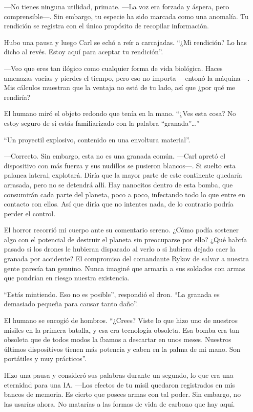 —No tienes ninguna utilidad, primate. —La voz era forzada y áspera, pero comprensible—. Sin embargo, tu especie ha sido marcada como una anomalía. Tu rendición se registra con el único propósito de recopilar información.

Hubo una pausa y luego Carl se echó a reír a carcajadas. “¿Mi rendición? Lo has dicho al revés. Estoy aquí para aceptar tu rendición”.

—Veo que eres tan ilógico como cualquier forma de vida biológica. Haces amenazas vacías y pierdes el tiempo, pero eso no importa —entonó la máquina—. Mis cálculos muestran que la ventaja no está de tu lado, así que ¿por qué me rendiría?

El humano miró el objeto redondo que tenía en la mano. “¿Ves esta cosa? No estoy seguro de si estás familiarizado con la palabra “granada”…”

“Un proyectil explosivo, contenido en una envoltura material”.

—Correcto. Sin embargo, esta no es una granada común. —Carl apretó el dispositivo con más fuerza y sus nudillos se pusieron blancos—. Si suelto esta palanca lateral, explotará. Diría que la mayor parte de este continente quedaría arrasada, pero no se detendrá allí. Hay nanocitos dentro de esta bomba, que consumirán cada parte del planeta, poco a poco, infectando todo lo que entre en contacto con ellos. Así que diría que no intentes nada, de lo contrario podría perder el control.

El horror recorrió mi cuerpo ante su comentario sereno. ¿Cómo podía sostener algo con el potencial de destruir el planeta sin preocuparse por ello? ¿Qué habría pasado si los drones le hubieran disparado al verlo o si hubiera dejado caer la granada por accidente? El compromiso del comandante Rykov de salvar a nuestra gente parecía tan genuino. Nunca imaginé que armaría a sus soldados con armas que pondrían en riesgo nuestra existencia.

“Estás mintiendo. Eso no es posible”, respondió el dron. “La granada es demasiado pequeña para causar tanto daño”.

El humano se encogió de hombros. “¿Crees? Viste lo que hizo uno de nuestros misiles en la primera batalla, y esa era tecnología obsoleta. Esa bomba era tan obsoleta que de todos modos la íbamos a descartar en unos meses. Nuestros últimos dispositivos tienen más potencia y caben en la palma de mi mano. Son portátiles y muy prácticos”.

Hizo una pausa y consideró sus palabras durante un segundo, lo que era una eternidad para una IA. —Los efectos de tu misil quedaron registrados en mis bancos de memoria. Es cierto que posees armas con tal poder. Sin embargo, no las usarías ahora. No matarías a las formas de vida de carbono que hay aquí.

